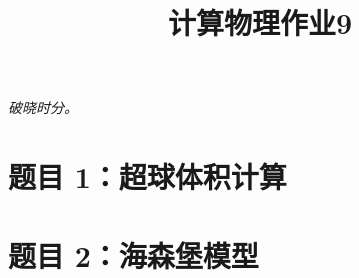 \documentclass[11pt]{article}
\author{
    \makebox[0.8\textwidth]{%
        \centering
        杨远青 \quad 22300190015 \quad
        \href{https://github.com/bud-primordium/Computational-Physics-Fall-2024}{\raisebox{-2pt}{\texttt{[image: ../utils/comphys.pdf]}}}
    }
}
\title{计算物理作业9}
\begin{document}
\maketitle
\textit{破晓时分。}
\section{题目 1：超球体积计算}


\section{题目 2：海森堡模型}

\end{document}
